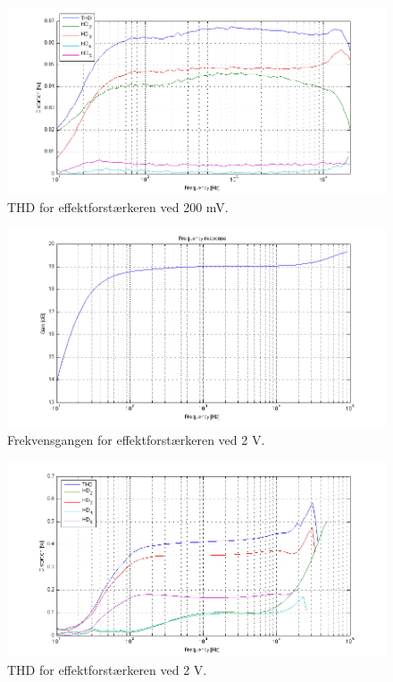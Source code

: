 \begin{figure}[h]
\centering
\includegraphics[width=\textwidth]{maalerapporter/effektforstaerker/200mV-45mA-uden-modstand-thd.png}
\caption{THD for effektforstærkeren ved 200 mV.}
\label{fig:apeff:thd200mv}
\end{figure}

\begin{figure}[h]
\centering
\includegraphics[width=\textwidth]{maalerapporter/effektforstaerker/2V-45mA-uden-modstand-frek.png}
\caption{Frekvensgangen for effektforstærkeren ved 2 V.}
\label{fig:apeff:frek2v}
\end{figure}

\begin{figure}[h]
\centering
\includegraphics[width=\textwidth]{maalerapporter/effektforstaerker/2V-45mA-uden-modstand-thd.png}
\caption{THD for effektforstærkeren ved 2 V.}
\label{fig:apeff:thd2v}
\end{figure}

